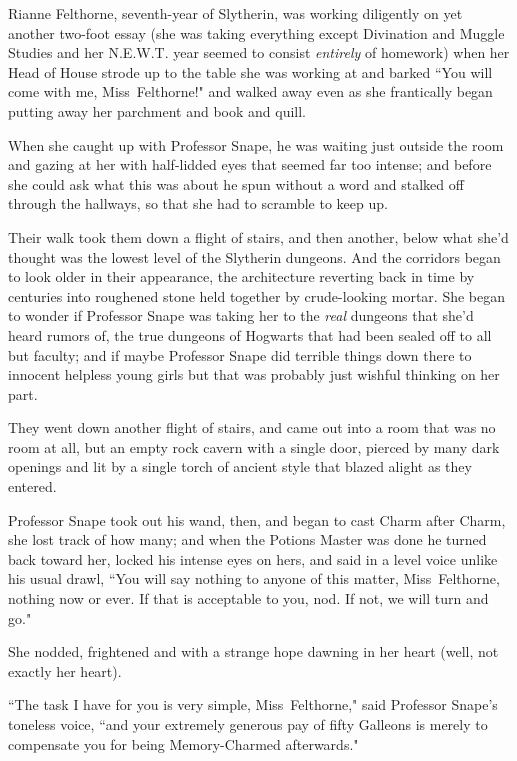 \later

Rianne Felthorne, seventh-year of Slytherin, was working diligently on yet another two-foot essay (she was taking everything except Divination and Muggle Studies and her N.E.W.T. year seemed to consist \emph{entirely} of homework) when her Head of House strode up to the table she was working at and barked ``You will come with me, Miss~Felthorne!" and walked away even as she frantically began putting away her parchment and book and quill.

When she caught up with Professor Snape, he was waiting just outside the room and gazing at her with half-lidded eyes that seemed far too intense; and before she could ask what this was about he spun without a word and stalked off through the hallways, so that she had to scramble to keep up.

Their walk took them down a flight of stairs, and then another, below what she'd thought was the lowest level of the Slytherin dungeons. And the corridors began to look older in their appearance, the architecture reverting back in time by centuries into roughened stone held together by crude-looking mortar. She began to wonder if Professor Snape was taking her to the \emph{real} dungeons that she'd heard rumors of, the true dungeons of Hogwarts that had been sealed off to all but faculty; and if maybe Professor Snape did terrible things down there to innocent helpless young girls but that was probably just wishful thinking on her part.

They went down another flight of stairs, and came out into a room that was no room at all, but an empty rock cavern with a single door, pierced by many dark openings and lit by a single torch of ancient style that blazed alight as they entered.

Professor Snape took out his wand, then, and began to cast Charm after Charm, she lost track of how many; and when the Potions Master was done he turned back toward her, locked his intense eyes on hers, and said in a level voice unlike his usual drawl, ``You will say nothing to anyone of this matter, Miss~Felthorne, nothing now or ever. If that is acceptable to you, nod. If not, we will turn and go."

She nodded, frightened and with a strange hope dawning in her heart (well, not exactly her heart).

``The task I have for you is very simple, Miss~Felthorne," said Professor Snape's toneless voice, ``and your extremely generous pay of fifty Galleons is merely to compensate you for being Memory-Charmed afterwards."

